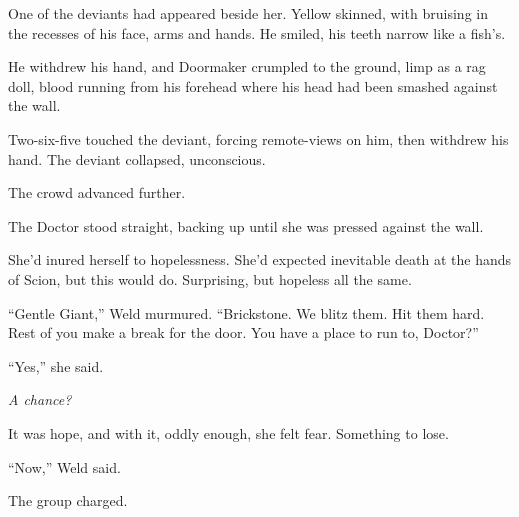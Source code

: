 One of the deviants had appeared beside her.  Yellow skinned, with bruising in the recesses of his face, arms and hands.  He smiled, his teeth narrow like a fish's.



He withdrew his hand, and Doormaker crumpled to the ground, limp as a rag doll, blood running from his forehead where his head had been smashed against the wall.



Two-six-five touched the deviant, forcing remote-views on him, then withdrew his hand.  The deviant collapsed, unconscious.



The crowd advanced further.



The Doctor stood straight, backing up until she was pressed against the wall.



She'd inured herself to hopelessness.  She'd expected inevitable death at the hands of Scion, but this would do.  Surprising, but hopeless all the same.



``Gentle Giant,'' Weld murmured.  ``Brickstone.  We blitz them.  Hit them hard.  Rest of you make a break for the door.  You have a place to run to, Doctor?''



``Yes,'' she said.



\emph{A chance?}



It was hope, and with it, oddly enough, she felt fear.  Something to lose.



``Now,'' Weld said.



The group charged.





